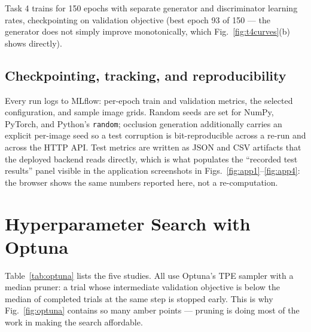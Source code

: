 \documentclass[journal]{IEEEtran}
\begin{document}
Task 4 trains for 150 epochs with separate generator and discriminator learning rates, checkpointing on validation objective (best epoch 93 of 150 --- the generator does not simply improve monotonically, which Fig.~\ref{fig:t4curves}(b) shows directly).

\subsection{Checkpointing, tracking, and reproducibility}

Every run logs to MLflow: per-epoch train and validation metrics, the selected configuration, and sample image grids. Random seeds are set for NumPy, PyTorch, and Python's \texttt{random}; occlusion generation additionally carries an explicit per-image seed so a test corruption is bit-reproducible across a re-run and across the HTTP API. Test metrics are written as JSON and CSV artifacts that the deployed backend reads directly, which is what populates the ``recorded test results'' panel visible in the application screenshots in Figs.~\ref{fig:app1}--\ref{fig:app4}: the browser shows the same numbers reported here, not a re-computation.

\section{Hyperparameter Search with Optuna}
\label{sec:optuna}

Table~\ref{tab:optuna} lists the five studies. All use Optuna's TPE sampler with a median pruner: a trial whose intermediate validation objective is below the median of completed trials at the same step is stopped early. This is why Fig.~\ref{fig:optuna} contains so many amber points --- pruning is doing most of the work in making the search affordable.
\end{document}
